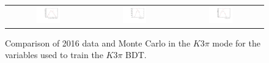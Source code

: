 \begin{figure}
\begin{tabular}{ccc}
\includegraphics[width=0.3\textwidth]{ANA_resources/Plots/Monte_carlo/data_vs_MC/Kpipipi/log10(KstarPi_IPCHI2_OWNPV)_2016.pdf} & \includegraphics[width=0.3\textwidth]{ANA_resources/Plots/Monte_carlo/data_vs_MC/Kpipipi/log10(KstarK_PT)_2016.pdf} & \includegraphics[width=0.3\textwidth]{ANA_resources/Plots/Monte_carlo/data_vs_MC/Kpipipi/log10(KstarPi_PT)_2016.pdf} \\
\end{tabular}
\caption{Comparison of 2016 data and Monte Carlo in the $K3\pi$ mode for the variables used to train the $K3\pi$ BDT.}
\label{fig:data_vs_MC_Kpipipi_2016}
\end{figure}
